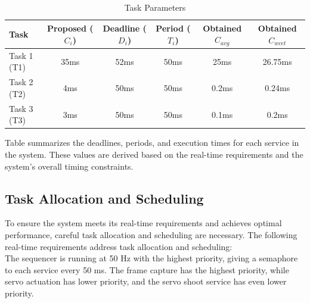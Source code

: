 \documentclass[a4paper,11pt]{article}%
\begin{document}
\begin{table}[H]
    \centering
    \begin{tabular}{|l|c|c|c|c|c|}
    \hline
    Task & Proposed ($C_i$) & Deadline ($D_i$) & Period ($T_i$) & Obtained $C_{avg}$ & Obtained $C_{wcet}$  \\
    \hline
    Task 1 (T1) & 35ms & 52ms & 50ms & 25ms & 26.75ms\\
    Task 2 (T2) & 4ms & 50ms & 50ms & 0.2ms & 0.24ms\\
    Task 3 (T3) & 3ms & 50ms & 50ms & 0.1ms & 0.2ms\\
    \hline
    \end{tabular}
\caption{Task Parameters}
\end{table}
Table summarizes the deadlines, periods, and execution times for each service in the system. These values are derived based on the real-time requirements and the system's overall timing constraints.
\subsection{Task Allocation and Scheduling}
To ensure the system meets its real-time requirements and achieves optimal performance, careful task allocation and scheduling are necessary. The following real-time requirements address task allocation and scheduling:\\
The sequencer is running at 50 Hz with the highest priority, giving a semaphore to each service every 50 ms. The frame capture has the highest priority, while servo actuation has lower priority, and the servo shoot service has even lower priority.
\end{document}
